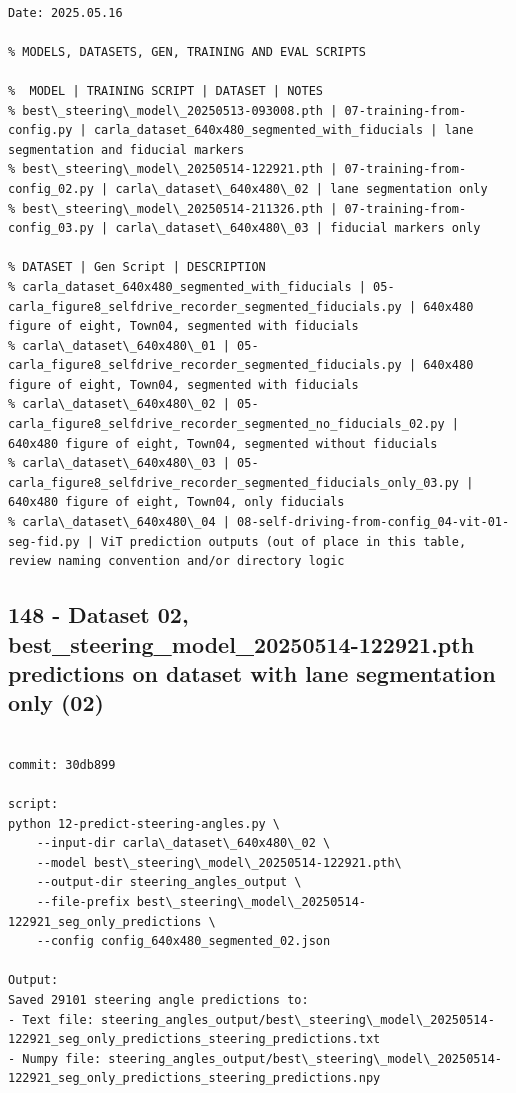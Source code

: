 \begin{verbatim}

Date: 2025.05.16

% MODELS, DATASETS, GEN, TRAINING AND EVAL SCRIPTS

%  MODEL | TRAINING SCRIPT | DATASET | NOTES
% best\_steering\_model\_20250513-093008.pth | 07-training-from-config.py | carla_dataset_640x480_segmented_with_fiducials | lane segmentation and fiducial markers
% best\_steering\_model\_20250514-122921.pth | 07-training-from-config_02.py | carla\_dataset\_640x480\_02 | lane segmentation only
% best\_steering\_model\_20250514-211326.pth | 07-training-from-config_03.py | carla\_dataset\_640x480\_03 | fiducial markers only

% DATASET | Gen Script | DESCRIPTION
% carla_dataset_640x480_segmented_with_fiducials | 05-carla_figure8_selfdrive_recorder_segmented_fiducials.py | 640x480 figure of eight, Town04, segmented with fiducials
% carla\_dataset\_640x480\_01 | 05-carla_figure8_selfdrive_recorder_segmented_fiducials.py | 640x480 figure of eight, Town04, segmented with fiducials
% carla\_dataset\_640x480\_02 | 05-carla_figure8_selfdrive_recorder_segmented_no_fiducials_02.py | 640x480 figure of eight, Town04, segmented without fiducials
% carla\_dataset\_640x480\_03 | 05-carla_figure8_selfdrive_recorder_segmented_fiducials_only_03.py | 640x480 figure of eight, Town04, only fiducials
% carla\_dataset\_640x480\_04 | 08-self-driving-from-config_04-vit-01-seg-fid.py | ViT prediction outputs (out of place in this table, review naming convention and/or directory logic

\end{verbatim}

\subsection{148 - Dataset 02, best\_steering\_model\_20250514-122921.pth predictions on dataset with lane segmentation only (02)}
\label{app_res:148}

\begin{verbatim}

commit: 30db899

script:
python 12-predict-steering-angles.py \
    --input-dir carla\_dataset\_640x480\_02 \
    --model best\_steering\_model\_20250514-122921.pth\
    --output-dir steering_angles_output \
    --file-prefix best\_steering\_model\_20250514-122921_seg_only_predictions \
    --config config_640x480_segmented_02.json

Output:
Saved 29101 steering angle predictions to:
- Text file: steering_angles_output/best\_steering\_model\_20250514-122921_seg_only_predictions_steering_predictions.txt
- Numpy file: steering_angles_output/best\_steering\_model\_20250514-122921_seg_only_predictions_steering_predictions.npy

\end{verbatim}

